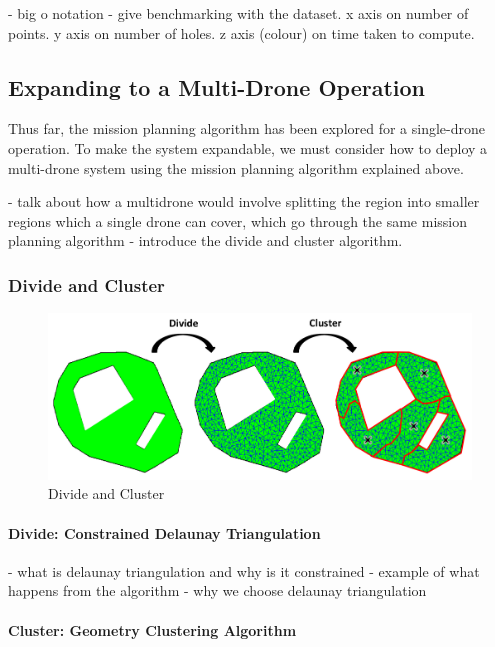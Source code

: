 - big o notation
- give benchmarking with the dataset. x axis on number of points. y axis on number of holes. z axis (colour) on time taken to compute. 

\subsection{Expanding to a Multi-Drone Operation}
\label{sec:msp_multi_drone}

Thus far, the mission planning algorithm has been explored for a single-drone operation. To make the system expandable, we must consider how to deploy a multi-drone system using the mission planning algorithm explained above. 

- talk about how a multidrone would involve splitting the region into smaller regions which a single drone can cover, which go through the same mission planning algorithm
- introduce the divide and cluster algorithm. 

\subsubsection{Divide and Cluster}

\begin{figure}[h]
    \centering
    \includegraphics[width=\linewidth]{figs/Jihwan/Divide and Cluster.png}
    \caption[Divide and Cluster]
    {Divide and Cluster}
    \label{fig:msp_divide_cluster}
\end{figure}

\paragraph{Divide: Constrained Delaunay Triangulation}

- what is delaunay triangulation and why is it constrained
- example of what happens from the algorithm
- why we choose delaunay triangulation

\paragraph{Cluster: Geometry Clustering Algorithm}

